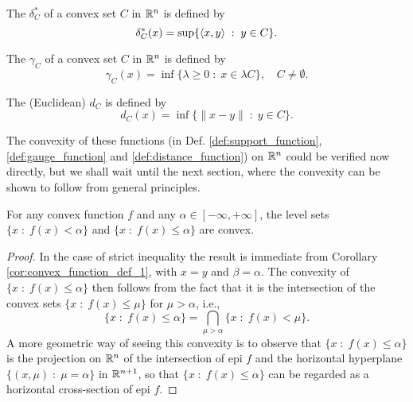 \documentclass[11pt,a4paper]{article}
\begin{document}
\begin{definition}\label{def:support_function}
    The  $\delta_C^*$ of a convex set $C$ in $\mathbb{R}^n$ is defined by
    \begin{equation*}
        \delta_C^*(x) = \sup\{\langle x, y \rangle\;:\;y\in C\}.
    \end{equation*}
\end{definition}

\begin{definition}\label{def:gauge_function}
    The  $\gamma_C$ of a convex set $C$ in $\mathbb{R}^n$ is defined by 
    \begin{equation*}
        \gamma_C(x) = \inf\{\lambda\ge 0\;:\; x\in \lambda C\},\quad C\neq \emptyset.
    \end{equation*}
\end{definition}

\begin{definition}\label{def:distance_function}
    The (Euclidean)  $d_C$ is defined by
    \begin{equation*}
        d_C(x) = \inf\{\|x-y\|\;:\;y\in C\}.
    \end{equation*}
\end{definition}

\begin{remark}
    The convexity of these functions (in Def. \ref{def:support_function}, \ref{def:gauge_function} and \ref{def:distance_function}) on $\mathbb{R}^n$ could be verified now directly, but we shall wait until the next section, where the convexity can be shown to follow from general principles.
\end{remark}

\begin{theorem}\label{thm:convex_level_sets}
    For any convex function $f$ and any $\alpha\in [-\infty,+\infty]$, the level sets $\{x\;:\;f(x)<\alpha\}$ and $\{x\;:\;f(x)\le\alpha\}$ are convex.
\end{theorem}

\begin{proof}
    In the case of strict inequality the result is immediate from Corollary \ref{cor:convex_function_def_1}, with $x = y$ and $\beta = \alpha$. The convexity of $\{x\;:\;f(x)\le \alpha\}$ then follows from the fact that it is the intersection of the convex sets $\{x\;:\;f(x)\le \mu\}$ for $\mu>\alpha$, i.e.,
    \begin{equation*}
        \{x\;:\;f(x)\le \alpha\} = \bigcap_{\mu>\alpha} \{x\;:\;f(x)< \mu\}.
    \end{equation*}
    A more geometric way of seeing this convexity is to observe that $\{x\;:\;f(x)\le \alpha\}$ is the projection on $\mathbb{R}^n$ of the intersection of epi $f$ and the horizontal hyperplane $\{(x,\mu)\;:\;\mu=\alpha\}$ in $\mathbb{R}^{n+1}$, so that $\{x\;:\;f(x)\le \alpha\}$ can be regarded as a horizontal cross-section of epi $f$.
\end{proof}
\end{document}
